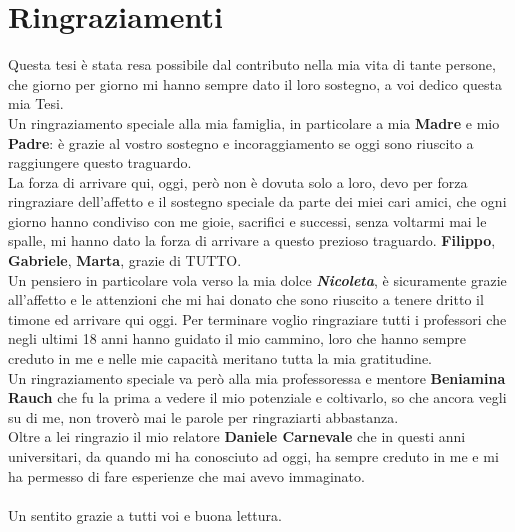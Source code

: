 \chapter*{Ringraziamenti}
\vspace{-8mm}
Questa tesi è stata resa possibile dal contributo nella mia vita di tante persone, che giorno per giorno mi hanno sempre dato il loro sostegno, a voi dedico questa mia Tesi.\\
Un ringraziamento speciale alla mia famiglia, in particolare a mia \textbf{Madre} e mio \textbf{Padre}: è grazie al vostro sostegno e incoraggiamento se oggi sono riuscito a raggiungere questo traguardo.\\
La forza di arrivare qui, oggi, però non è dovuta solo a loro, devo per forza ringraziare dell'affetto e il sostegno speciale da parte dei miei cari amici, che ogni giorno hanno condiviso con me gioie, sacrifici e successi, senza voltarmi mai le spalle, mi hanno dato la forza di arrivare a questo prezioso traguardo. \textbf{Filippo}, \textbf{Gabriele}, \textbf{Marta}, grazie di TUTTO.\\
Un pensiero in particolare vola verso la mia dolce \textbf{\textit{Nicoleta}}, è sicuramente grazie all'affetto e le attenzioni che mi hai donato che sono riuscito a tenere dritto il timone ed arrivare qui oggi.
Per terminare voglio ringraziare tutti i professori che negli ultimi 18 anni hanno guidato il mio cammino, loro che hanno sempre creduto in me e nelle mie capacità meritano tutta la mia gratitudine.\\
Un ringraziamento speciale va però alla mia professoressa e mentore \textbf{Beniamina Rauch} che fu la prima a vedere il mio potenziale e coltivarlo, so che ancora vegli su di me, non troverò mai le parole per ringraziarti abbastanza.\\
Oltre a lei ringrazio il mio relatore \textbf{Daniele Carnevale} che in questi anni universitari, da quando mi ha conosciuto ad oggi, ha sempre creduto in me e mi ha permesso di fare esperienze che mai avevo immaginato.\\ \\
Un sentito grazie a tutti voi e buona lettura.


